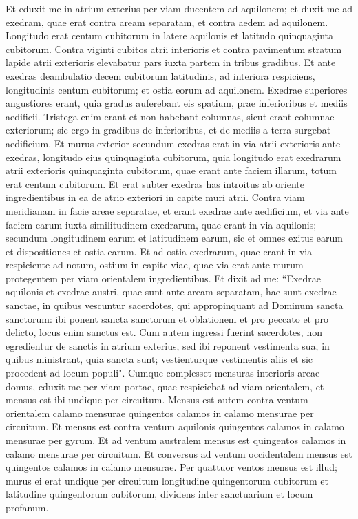 \begin{biblechapter}  
\verse Et eduxit me in atrium exterius per viam ducentem ad aquilonem; et duxit me ad exedram, quae erat contra aream separatam, et contra aedem ad aquilonem.  
\verse Longitudo erat centum cubitorum in latere aquilonis et latitudo quinquaginta cubitorum. 
\verse Contra viginti cubitos atrii interioris et contra pavimentum stratum lapide atrii exterioris elevabatur pars iuxta partem in tribus gradibus.  
\verse Et ante exedras deambulatio decem cubitorum latitudinis, ad interiora respiciens, longitudinis centum cubitorum; et ostia eorum ad aquilonem. 
\verse Exedrae superiores angustiores erant, quia gradus auferebant eis spatium, prae inferioribus et mediis aedificii. 
\verse Tristega enim erant et non habebant columnas, sicut erant columnae exteriorum; sic ergo in gradibus de inferioribus, et de mediis a terra surgebat aedificium. 
\verse Et murus exterior secundum exedras erat in via atrii exterioris ante exedras, longitudo eius quinquaginta cubitorum, 
\verse quia longitudo erat exedrarum atrii exterioris quinquaginta cubitorum, quae erant ante faciem illarum, totum erat centum cubitorum. 
\verse Et erat subter exedras has introitus ab oriente ingredientibus in ea de atrio exteriori 
\verse in capite muri atrii. Contra viam meridianam in facie areae separatae, et erant exedrae ante aedificium, 
\verse et via ante faciem earum iuxta similitudinem exedrarum, quae erant in via aquilonis; secundum longitudinem earum et latitudinem earum, sic et omnes exitus earum et dispositiones et ostia earum. 
\verse Et ad ostia exedrarum, quae erant in via respiciente ad notum, ostium in capite viae, quae via erat ante murum protegentem per viam orientalem ingredientibus. 
\verse Et dixit ad me: “Exedrae aquilonis et exedrae austri, quae sunt ante aream separatam, hae sunt exedrae sanctae, in quibus vescuntur sacerdotes, qui appropinquant ad Dominum sancta sanctorum: ibi ponent sancta sanctorum et oblationem et pro peccato et pro delicto, locus enim sanctus est. 
\verse Cum autem ingressi fuerint sacerdotes, non egredientur de sanctis in atrium exterius, sed ibi reponent vestimenta sua, in quibus ministrant, quia sancta sunt; vestienturque vestimentis aliis et sic procedent ad locum populi". 
\verse Cumque complesset mensuras interioris areae domus, eduxit me per viam portae, quae respiciebat ad viam orientalem, et mensus est ibi undique per circuitum.  
\verse Mensus est autem contra ventum orientalem calamo mensurae quingentos calamos in calamo mensurae per circuitum. 
\verse Et mensus est contra ventum aquilonis quingentos calamos in calamo mensurae per gyrum. 
\verse Et ad ventum australem mensus est quingentos calamos in calamo mensurae per circuitum. 
\verse Et conversus ad ventum occidentalem mensus est quingentos calamos in calamo mensurae. 
\verse Per quattuor ventos mensus est illud; murus ei erat undique per circuitum longitudine quingentorum cubitorum et latitudine quingentorum cubitorum, dividens inter sanctuarium et locum profanum. 
\end{biblechapter}

